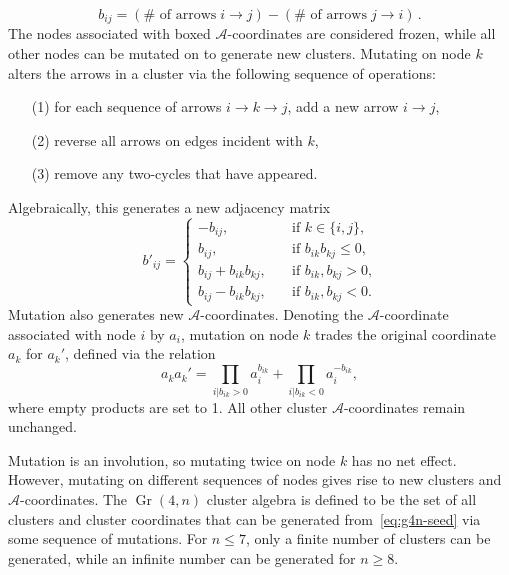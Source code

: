 \documentclass[11pt]{article}
\DeclareMathOperator{\Gr}{Gr}
\def\a{\mathcal{A}}
\begin{document}
\begin{equation}
b_{i j} = (\# \text{ of arrows}\; i \to j) - (\# \text{ of arrows}\; j \to i) \, .
\label{eq:bijdef}
\end{equation}
The nodes associated with boxed $\a$-coordinates are considered frozen, while all other nodes can be mutated on to generate new clusters. Mutating on node $k$ alters the arrows in a cluster via the following sequence of operations:
\begin{itemize}
	\item[(1)] for each sequence of arrows $i\to k \to j$, add a new arrow $i\to j$,
	\item[(2)] reverse all arrows on edges incident with $k$,
	\item[(3)] remove any two-cycles that have appeared.
\end{itemize}
Algebraically, this generates a new adjacency matrix 
\begin{equation}
  \label{eq:b-mutation}
  b'_{i j} =
  \begin{cases}
    -b_{i j}, &\quad \text{if $k \in \lbrace i, j\rbrace$,}\\
    b_{i j}, &\quad \text{if $b_{i k} b_{k j} \leq 0$,}\\
    b_{i j} + b_{i k} b_{k j}, &\quad \text{if $b_{i k}, b_{k j} > 0$,}\\
    b_{i j} - b_{i k} b_{k j}, &\quad \text{if $b_{i k}, b_{k j} < 0$.}
  \end{cases}
\end{equation}
Mutation also generates new $\a$-coordinates. Denoting the $\a$-coordinate associated with node $i$ by $a_i$, mutation on node $k$ trades the original coordinate $a_k$ for $a_k'$, defined via the relation
\begin{equation}
  \label{eq:a-coord-mutation}
  a_{k} a_{k}' = \prod_{i \vert b_{i k} > 0} a_{i}^{b_{i k}} + \prod_{i \vert b_{i k} < 0} a_{i}^{-b_{i k}},
\end{equation} 
where empty products are set to 1. All other cluster $\a$-coordinates remain unchanged. 

Mutation is an involution, so mutating twice on node $k$ has no net effect. However, mutating on different sequences  of nodes gives rise to new clusters and $\a$-coordinates. The $\Gr(4,n)$ cluster algebra is defined to be the set of all clusters and cluster coordinates that can be generated from~\eqref{eq:g4n-seed} via some sequence of mutations. For $n \le 7$, only a finite number of clusters can be generated, while an infinite number can be generated for $n\ge8$. 
\end{document}
